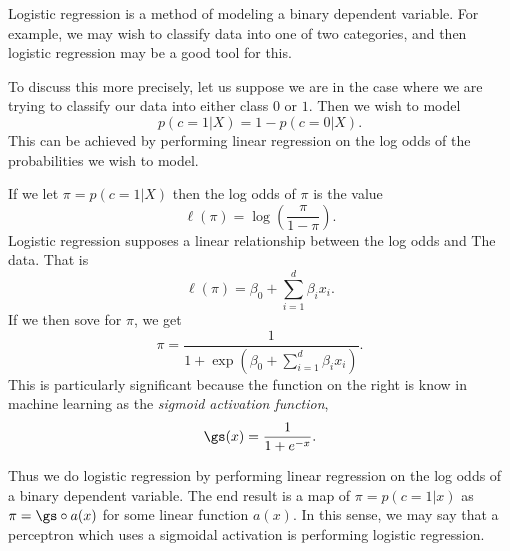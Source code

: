 
Logistic regression is a method of modeling a binary dependent variable.  For 
example, we may wish to classify data into one of two categories, and then 
logistic regression may be a good tool for this.

To discuss this more precisely, let us suppose we are in the case where we are 
trying to classify our data into either class \(0\) or \(1\).  Then we wish to 
model  \[p(c=1|X) = 1-p(c=0|X).\]
This can be achieved by performing linear regression on the log odds of the 
probabilities we wish to model.

If we let \(\pi=p(c=1|X)\) then the log odds of \(\pi\) is the value
\[\ell(\pi) = \log\left(\frac{\pi}{1-\pi}\right).\]
Logistic regression supposes a linear relationship between the log odds and 
The data.  That is
\[\ell(\pi) = \beta_0+\sum_{i=1}^{d} \beta_ix_i.\]
If we then sove for \(\pi\), we get 
\[\pi = \frac{1}{1+\exp(\beta_0+\sum_{i=1}^{d} \beta_ix_i)}.\]
This is particularly significant because the function on the right is know in 
machine learning as the \textit{sigmoid activation function}, 
\[\gs(x) =\frac{1}{1+e^{-x}}.\]

Thus we do logistic regression by performing linear regression on the log odds 
of a binary dependent variable.  The end result is a map of \(\pi = p(c=1|x)\) 
as \(\pi = \gs\circ a(x)\) for some linear function \(a(x)\). In this sense, we
may say that a perceptron which uses a sigmoidal activation is performing 
logistic regression.